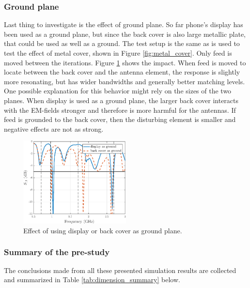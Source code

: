 \subsubsection{Ground plane}
\label{sec:ground_plane}
Last thing to investigate is the effect of ground plane. So far phone's display has been used as a ground plane, but since the back cover is also large metallic plate, that could be used as well as a ground. The test setup is the same as is used to test the effect of metal cover, shown in Figure \ref{fig:metal_cover}. Only feed is moved between the iterations. Figure \ref{fig:ground_plane} shows the impact. When feed is moved to locate between the back cover and the antenna element, the response is slightly more resonating, but has wider bandwidths and generally better matching levels. One possible explanation for this behavior might rely on the sizes of the two planes. When display is used as a ground plane, the larger back cover interacts with the EM-fields stronger and therefore is more harmful for the antennas. If feed is grounded to the back cover, then the disturbing element is smaller and negative effects are not as strong.

\begin{figure}[H]
    \centering
    \includegraphics[width=0.5\textwidth]{img/ground_vs_display.eps}
    \caption{Effect of using display or back cover as ground plane.}
    \label{fig:ground_plane}
\end{figure}

\subsubsection{Summary of the pre-study}
\label{sec:pre_study_summary}
The conclusions made from all these presented simulation results are collected and summarized in Table \ref{tab:dimension_summary} below. 

